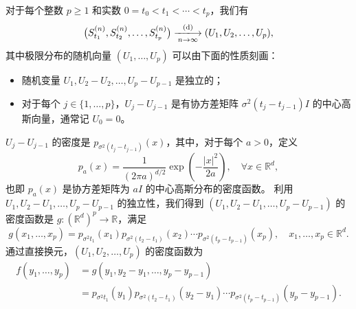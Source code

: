 \begin{proposition}
  对于每个整数 $p\geq 1$ 和实数 $0=t_0<t_1<\cdots<t_p$，我们有
  \[
    \bigl(S_{t_1}^{(n)},S_{t_2}^{(n)},\dots,S_{t_p}^{(n)}\bigr)\xlongrightarrow[n\to\infty]{(\mathrm{d})}
    (U_1,U_2,\dots,U_p),
  \]
  其中极限分布的随机向量 $(U_1,\dots,U_p)$ 可以由下面的性质刻画：
  \begin{itemize}[noitemsep]
    \item 随机变量 $U_1,U_2-U_2,\dots,U_p-U_{p-1}$ 是独立的；
    \item 对于每个 $j\in\{1,\dots,p\}$，$U_j-U_{j-1}$ 是有协方差矩阵
    $\sigma^2(t_j-t_{j-1})I$ 的中心高斯向量，通常记 $U_0=0$。
  \end{itemize}
\end{proposition}

\begin{remark}
  $U_j-U_{j-1}$ 的密度是 $p_{\sigma^2(t_j-t_{j-1})}(x)$，其中，对于每个
  $a>0$，定义
  \begin{equation}\label{eq:gaussian density}
    p_a(x)=\frac{1}{(2\pi a)^{d/2}}\exp\left(
      -\frac{|x|^2}{2a}
    \right),\quad \forall x\in \mathbb{R}^d,    
  \end{equation}
  也即 $p_a(x)$ 是协方差矩阵为 $aI$ 的中心高斯分布的密度函数。
  利用 $U_1,U_2-U_1,\dots,U_p-U_{p-1}$ 的独立性，我们得到
  $(U_1,U_2-U_1,\dots,U_p-U_{p-1})$ 的密度函数是 $g:(\mathbb{R}^d)^p\to \mathbb{R}$，满足
  \[
    g(x_1,\dots,x_p)=p_{\sigma^2 t_1}(x_1) p_{\sigma^2(t_2-t_1)}(x_2)\cdots p_{\sigma^2(t_p-t_{p-1})}(x_p),
    \quad x_1,\dots,x_p\in \mathbb{R}^d.
  \]
  通过直接换元，$(U_1,U_2,\dots,U_p)$ 的密度函数为
  \begin{align*}
    f(y_1,\dots,y_p)&=g(y_1,y_2-y_1,\dots,y_p-y_{p-1})\\
    &=p_{\sigma^2 t_1}(y_1) p_{\sigma^2(t_2-t_1)}(y_2-y_1)\cdots p_{\sigma^2(t_p-t_{p-1})}(y_p-y_{p-1}).
  \end{align*}
\end{remark}



 



